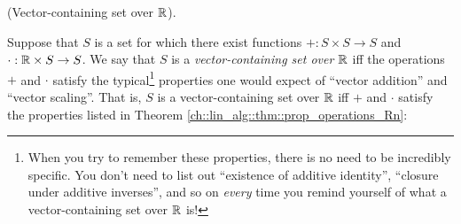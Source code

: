 \begin{defn}
    (Vector-containing set over $\mathbb{R}$).
    
    Suppose that $S$ is a set for which there exist functions $+:S \times S \rightarrow S$ and $\cdot:\mathbb{R} \times S \rightarrow S$. We say that $S$ is a \textit{vector-containing set over $\mathbb{R}$} iff the operations $+$ and $\cdot$ satisfy the typical\footnote{When you try to remember these properties, there is no need to be incredibly specific. You don't need to list out ``existence of additive identity'', ``closure under additive inverses'', and so on \textit{every} time you remind yourself of what a vector-containing set over $\mathbb{R}$ is!} properties one would expect of ``vector addition'' and ``vector scaling''. That is, $S$ is a vector-containing set over $\mathbb{R}$ iff $+$ and $\cdot$ satisfy the properties listed in Theorem \ref{ch::lin_alg::thm::prop_operations_Rn}:
    

\end{defn}
